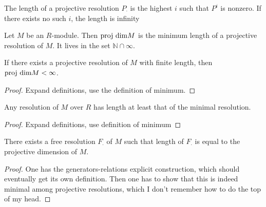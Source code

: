 \begin{definition}
  \label{def:length_of_resl}
  The length of a projective
  resolution $P_\cdot$ is 
  the highest $i$ such that $P^i$
  is nonzero.
  If there exists no such $i$, the
  length is infinity
\end{definition}

\begin{definition}
  \label{def:projdim}
  Let $M$ be an $R$-module. 
  Then $\text{proj dim} M$ is the minimum 
  length of a projective resolution of $M$.
  It lives in the set $\mathbb{N} \cap \infty$.
\end{definition}

\begin{lemma}
  \label{lem:finite_resl_implies_finite_projdim}
  If there exists a projective resolution of
  $M$ with finite length, then 
  $\text{proj dim} M < \infty$.
\end{lemma}

\begin{proof}
  Expand definitions, use the definition of minimum.
\end{proof}

\begin{lemma}
  \label{lem:min_resl_has_min_length}
  Any resolution of $M$ over $R$ has 
  length at least that of the minimal resolution.
\end{lemma}

\begin{proof}
  Expand definitions, use definition of minimum
\end{proof}

\begin{proposition}
  \label{prop:existence_min_free_resl}
  There exists a free resolution $F_\cdot$
  of $M$ such that length of $F_\cdot$
  is equal to the projective dimension of $M$.
\end{proposition}

\begin{proof}
  One has the generators-relations explicit construction,
  which should eventually get its own definition.
  Then one has to show that this is indeed minimal among
  projective resolutions, which I don't remember how to do
  the top of my head.
\end{proof}


